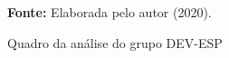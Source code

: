 \begin{figure}[ht!]
\centering

\caption{\textmd{Quadro da análise do grupo DEV-ESP}}
\label{fig:quadro:grupodevesp}

\par\medskip\textbf{Fonte:} Elaborada pelo autor (2020). \par\medskip

\end{figure}

